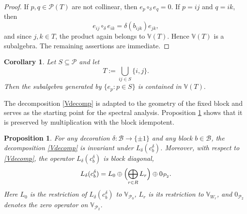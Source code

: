 \documentclass[times,11pt,reqno]{amsproc}
\newtheorem{proposition}[theorem]{Proposition}
\newtheorem{corollary}[theorem]{Corollary}
\theoremstyle{definition}
\numberwithin{equation}{section}
\def\valg{\mathbb{V}}
\begin{document}
\begin{proof}
If $p,q\in\mathcal P(T)$ are not collinear, then $e_p\circ_\delta e_q=0$. If $p=ij$ and $q=ik$, then \[ e_{ij}\circ_\delta e_{ik} = \delta(b_{ijk})e_{jk}, \] and since $j,k\in T$, the product again belongs to $\valg(T)$. Hence $\valg(T)$ is a subalgebra. The remaining assertions are immediate.
\end{proof}



\begin{corollary}\label{cor:where} Let $S\subseteq\mathcal{P}$ and let $$ T:=\bigcup_{ij\in S}\{i,j\}. $$ Then the subalgebra generated by $\{e_p:p\in S\}$ is contained in $\valg(T).$ \end{corollary}

The decomposition \eqref{Vdecomp} is adapted to the geometry of the fixed block and serves as the starting point for the spectral analysis. Proposition \ref{prop:blockdecomp} shows that it is preserved by multiplication with the block idempotent.

\begin{proposition}\label{prop:blockdecomp}
For any decoration $\delta:\mathcal{B}\to\{\pm1\}$ and any block $b\in\mathcal B$, the decomposition \eqref{Vdecomp} is invariant under $L_\delta(c_b^\delta)$. Moreover, with respect to \eqref{Vdecomp}, the operator $L_\delta(c_b^\delta)$ is block diagonal,
\begin{equation}\label{blockdiag}
L_\delta(c_b^\delta)
=
L_0
\oplus
\Bigl(
\bigoplus_{r\in R}L_r
\Bigr)
\oplus
0_{\mathcal{P}_2}.
\end{equation}
Here $L_0$ is the restriction of $L_\delta(c_b^\delta)$ to $\valg_{\mathcal{P}_0}$, $L_r$ is its restriction to $\valg_{W_r}$, and $0_{\mathcal{P}_2}$ denotes the zero operator on $\valg_{\mathcal{P}_2}$.
\end{proposition}
\end{document}
